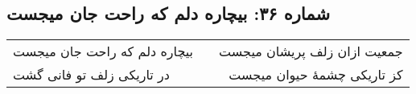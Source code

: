 \begin{center}
\section*{شماره ۳۶: بیچاره دلم که راحت جان میجست}
\label{sec:036}
\begin{longtable}{l p{0.5cm} r}
بیچاره دلم که راحت جان میجست
&&
جمعیت ازان زلف پریشان میجست
\\
در تاریکی زلف تو فانی گشت
&&
کز تاریکی چشمهٔ حیوان میجست
\\
\end{longtable}
\end{center}

